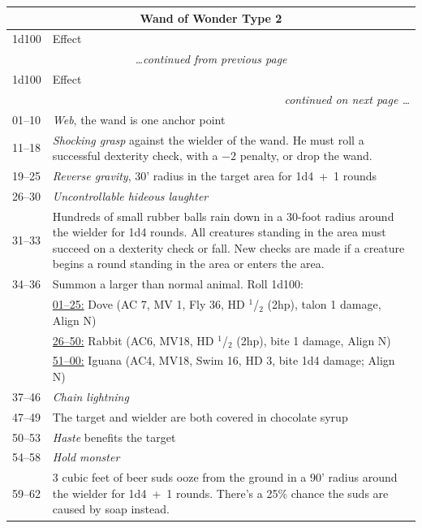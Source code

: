 \noindent \begin{longtable}{|p{}|p{}|}
\multicolumn{2}{c}{Wand of Wonder Type 2} \\
\hline
1d100	& Effect \\
\hline\hline
\endfirsthead
\multicolumn{2}{c}{\textit{\ldots continued from previous page}} \\
\hline
1d100	& Effect \\
\hline\hline
\endhead
\hline
\multicolumn{2}{r}{\textit{continued on next page \ldots}}\\
\endfoot
\hline
\endlastfoot
\rowcolor[gray]{.9}01--10	& \textit{Web}, the wand is one anchor point \\
11--18	& \textit{Shocking grasp} against the wielder of the wand.  He must roll a successful dexterity check, with a $-2$ penalty, or drop the wand. \\
\rowcolor[gray]{.9}19--25	& \textit{Reverse gravity}, 30' radius in the target area for 1d4~+~1 rounds \\
26--30	& \textit{Uncontrollable hideous laughter} \\
\rowcolor[gray]{.9}31--33	& Hundreds of small rubber balls rain down in a 30-foot radius around the wielder for 1d4 rounds.  All creatures standing in the area must succeed on a dexterity check or fall.  New checks are made if a creature begins a round standing in the area or enters the area. \\
34--36	& Summon a larger than normal animal.  Roll 1d100: \\
		& \underline{01--25:} Dove (AC 7, MV 1, Fly 36, HD $^1$/$_2$ (2hp), talon 1 damage, Align N) \\
		& \underline{26--50:} Rabbit (AC6, MV18, HD $^1$/$_2$ (2hp), bite 1 damage, Align N) \\
		& \underline{51--00:} Iguana (AC4, MV18, Swim 16, HD 3, bite 1d4 damage; Align N) \\
\rowcolor[gray]{.9}37--46	& \textit{Chain lightning} \\
47--49	& The target and wielder are both covered in chocolate syrup \\
\rowcolor[gray]{.9}50--53	& \textit{Haste} benefits the target \\
54--58	& \textit{Hold monster} \\
\rowcolor[gray]{.9}59--62	& 3 cubic feet of beer suds ooze from the ground in a 90' radius around the wielder for 1d4~+~1 rounds.  There's a 25\% chance the suds are caused by soap instead. \\

\end{longtable}
